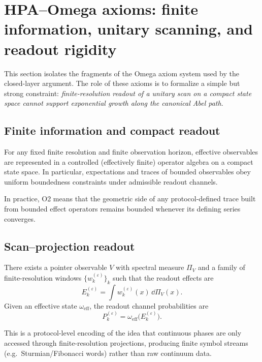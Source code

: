 
\section{HPA--Omega axioms: finite information, unitary scanning, and readout rigidity}
\label{sec:omega_axioms}

This section isolates the fragments of the Omega axiom system used by the closed-layer argument.
The role of these axioms is to formalize a simple but strong constraint: \emph{finite-resolution readout of a unitary scan on a compact state space cannot support exponential growth along the canonical Abel path}.

\subsection{Finite information and compact readout}
\label{sec:axiom_O2}

\begin{axiom}
\label{ax:O2}
For any fixed finite resolution and finite observation horizon, effective observables are represented in a controlled (effectively finite) operator algebra on a compact state space.
In particular, expectations and traces of bounded observables obey uniform boundedness constraints under admissible readout channels.
\end{axiom}

In practice, O2 means that the geometric side of any protocol-defined trace built from bounded effect operators remains bounded whenever its defining series converges.

\subsection{Scan--projection readout}
\label{sec:axiom_O5}

\begin{axiom}
\label{ax:O5}
There exists a pointer observable $V$ with spectral measure $\Pi_V$ and a family of finite-resolution windows $\{w_k^{(\varepsilon)}\}_k$ such that the readout effects are
\[
E_k^{(\varepsilon)}=\int w_k^{(\varepsilon)}(x)\,\dd\Pi_V(x).
\]
Given an effective state $\omega_{\mathrm{eff}}$, the readout channel probabilities are
\[
P_k^{(\varepsilon)}=\omega_{\mathrm{eff}}\!\bigl(E_k^{(\varepsilon)}\bigr).
\]
\end{axiom}

This is a protocol-level encoding of the idea that continuous phases are only accessed through finite-resolution projections, producing finite symbol streams (e.g.\ Sturmian/Fibonacci words) rather than raw continuum data.

